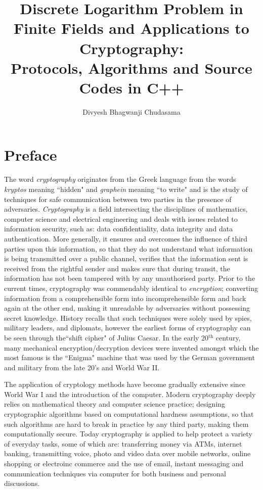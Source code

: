 \documentclass[iwp,first]{luthesis}
\title{\textsf{Discrete Logarithm Problem in Finite Fields and Applications to Cryptography:}
\\ \large{Protocols, Algorithms and Source Codes in C++}} %
\author{Divyesh Bhagwanji Chudasama} %
\begin{document}
\maketitle %

\frontmatter
\chapter{Preface}
The word \textit{cryptography} originates from the Greek language from the words \textit{kryptos} meaning ``hidden" and \textit{graphein} meaning ``to write" and is the study of techniques for safe communication between two parties in the presence of adversaries. \textit{Cryptography} is a field intersecting the disciplines of mathematics, computer science and electrical engineering and deals with issues related to information security, such as: data confidentiality, data integrity and data authentication. More generally, it ensures and overcomes the influence of third parties upon this information, so that they do not understand what information is being transmitted over a public channel, verifies that the information sent is received from the rightful sender and makes sure that during transit, the information has not been tampered with by any unauthorised party. Prior to the current times, cryptography was  commendably identical to \textit{encryption}; converting information from a comprehensible form into incomprehensible form and back again at the other end, making it unreadable by adversaries without possessing secret knowledge. History recalls that such techniques were solely used by spies, military leaders, and diplomats, however the earliest forms of cryptography can be seen through the``shift cipher" of Julius Caesar. In the early 20$^{\textrm{th}}$ century, many mechanical encryption/decryption devices were invented amongst which the most famous is the ``Enigma" machine that was used by the German government and military from the late 20's and World War II.

The application of cryptology methods have become gradually extensive since World War I and the introduction of the computer. Modern cryptography deeply relies on mathematical theory and computer science practice; designing cryptographic algorithms based on computational hardness assumptions, so that such algorithms are hard to break in practice by any third party, making them computationally secure. Today cryptography is applied to help protect a variety of everyday tasks, some of which are: transferring money via ATMs, internet banking, transmitting voice, photo and video data over mobile networks, online shopping or electroinc commerce and the use of email, instant messaging and communication techniques via computer for both business and personal discussions.
\end{document}

